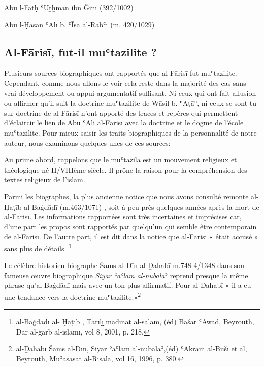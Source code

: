 \documentclass[a4paper,12pt]{report}
\begin{document}
\begin{itemize}
 Abū l-Fatḥ ʿUt̲h̲mān ibn Ǧinī (392/1002)

  Abū l-Ḥasan ʿAlī b. ʿĪsā al-Rabʿ\=i (m. 420/1029)


\newpage
\subsection{	Al-Fārisī, fut-il muʿtazilite ?}

Plusieurs  sources biographiques  ont rapportés que al-Fārisī fut muʿtazilite. Cependant, comme nous allons le voir cela reste  dans la majorité des cas sans vrai développement ou appui argumentatif suffisant. Ni ceux  qui ont fait allusion ou affirmer qu’il suit la doctrine muʿtazilite de Wāsil b. ʿAṭāʾ, ni ceux  se sont tu sur doctrine de al-Fārisī n’ont apporté des traces et repères qui permettent d’éclaircir le lien  de Abū ʿAli al-Fārisī  avec la doctrine et le dogme de l’école muʿtazilite.
Pour mieux  saisir les traits biographiques de la personnalité de notre auteur, nous examinons quelques unes de ces sources: 

Au prime abord, rappelons que le muʿtazila est un mouvement religieux et théologique né II/VIIIème siècle. Il prône la raison pour la compréhension des textes religieux de l'islam.   

Parmi les biographes, la plus ancienne notice que nous avons consulté  remonte al-Ḫaṭīb al-Baġdādī (m.463/1071) , soit  à peu près quelques années après la mort 
 de al-Fārisī. Les  informations rapportées sont très incertaines et imprécises car, d’une part les propos  sont rapportés par quelqu’un qui semble  être contemporain  de al-Fārisī. De l’autre part, il est dit dans la notice que al-Fārisī « était accusé » sans plus de détails. 
\footnote{al-Baġdādī al- Ḫaṭīb ,\underline  { Tārīḫ̬ madīnat al-salām,}  (éd) Bašār ʿAwād, Beyrouth, Dār al-ġarb al-islāmī, vol 8, 2001, p. 218. }

\begin{Arabic}
\end{Arabic}

Le célèbre historien-biographe Šams al-Dīn  al-Ḏahabī m.748-4/1348 dans son fameuse œuvre biographique \textit{Siyar ʾaʿlām al-nubalā}ʾ  reprend presque la même phrase qu’al-Baġdādī    mais avec un ton plus affirmatif. Pour al-Ḏahabī « il a eu une tendance vers la doctrine muʿtazilite.»\footnote{al-Ḏahabī Šams al-Dīn, \underline  { Siyar ʾaʿlām al-nubalā}ʾ,(éd) ʿAkram al-Bušī et al,  Beyrouth, Muʾasasat al-Risāla, vol 16, 1996, p. 380. } 


\end{itemize}
\end{document}
